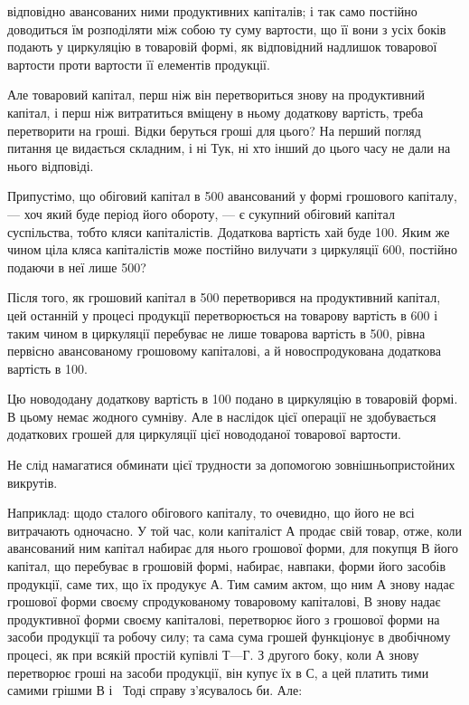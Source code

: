 \parcont{}  %
відповідно авансованих ними продуктивних капіталів; і так само постійно
доводиться їм розподіляти між собою ту суму вартости, що її вони
з усіх боків подають у циркуляцію в товаровій формі, як відповідний
надлишок товарової вартости проти вартости її елементів продукції.

Але товаровий капітал, перш ніж він перетвориться знову на продуктивний
капітал, і перш ніж витратиться вміщену в ньому додаткову
вартість, треба перетворити на гроші. Відки беруться гроші для цього?
На перший погляд питання це видається складним, і ні Тук, ні хто інший
до цього часу не дали на нього відповіді.

Припустімо, що обіговий капітал в 500 авансований у формі
грошового капіталу, — хоч який буде період його обороту, — є сукупний
обіговий капітал суспільства, тобто кляси капіталістів. Додаткова вартість
хай буде 100. Яким же чином ціла кляса капіталістів може постійно
вилучати з циркуляції 600, постійно подаючи в неї
лише 500?

Після того, як грошовий капітал в 500 перетворився на
продуктивний капітал, цей останній у процесі продукції перетворюється
на товарову вартість в 600 і таким чином в циркуляції перебуває
не лише товарова вартість в 500, рівна первісно авансованому
грошовому капіталові, а й новоспродукована додаткова
вартість в 100.

Цю новододану додаткову вартість в 100 подано в циркуляцію
в товаровій формі. В цьому немає жодного сумніву. Але в наслідок
цієї операції не здобувається додаткових грошей для циркуляції
цієї новододаної товарової вартости.

Не слід намагатися обминати цієї трудности за допомогою зовнішньопристойних
викрутів.

Наприклад: щодо сталого обігового капіталу, то очевидно, що його
не всі витрачають одночасно. У той час, коли капіталіст $А$ продає
свій товар, отже, коли авансований ним капітал набирає для нього грошової
форми, для покупця $В$ його капітал, що перебуває в грошовій
формі, набирає, навпаки, форми його засобів продукції, саме тих, що їх
продукує $А$. Тим самим актом, що ним $А$ знову надає грошової форми
своєму спродукованому товаровому капіталові, $В$ знову надає продуктивної
форми своєму капіталові, перетворює його з грошової форми на засоби
продукції та робочу силу; та сама сума грошей функціонує в двобічному
процесі, як при всякій простій купівлі $Т — Г$. З другого боку, коли
$А$ знову перетворює гроші на засоби продукції, він купує їх в $С$, а
цей платить тими самими грішми $В$ і~ Тоді справу з’ясувалось би. Але:

